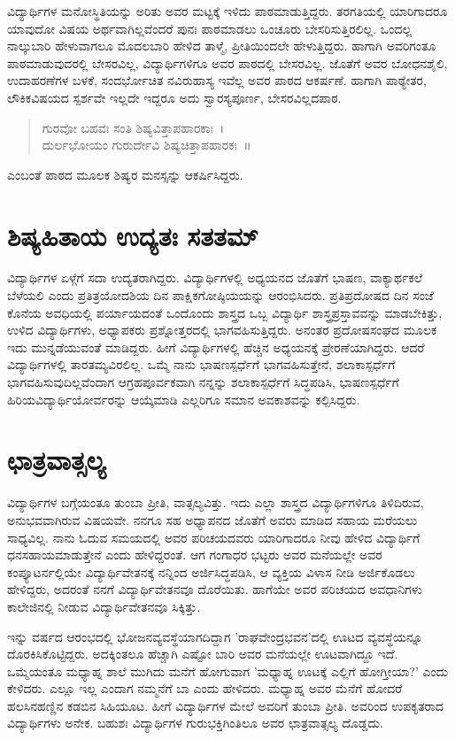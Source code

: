 {ವಿದ್ಯಾರ್ಥಿಗಳ ಮನೋಸ್ಥಿತಿಯನ್ನು ಅರಿತು ಅವರ ಮಟ್ಟಕ್ಕೆ ಇಳಿದು ಪಾಠಮಾಡುತ್ತಿದ್ದರು. ತರಗತಿಯಲ್ಲಿ ಯಾರಿಗಾದರೂ ಯಾವುದೋ ವಿಷಯ ಅರ್ಥವಾಗಿಲ್ಲವೆಂದರೆ ಪುನಃ ಪಾಠಮಾಡಲು ಒಂಚೂರು ಬೇಸರಿಸುತ್ತಿರಲಿಲ್ಲ. ಒಂದಲ್ಲ ನಾಲ್ಕುಬಾರಿ ಹೇಳುವಾಗಲೂ ಮೊದಲಬಾರಿ ಹೇಳಿದ ತಾಳ್ಮೆ, ಪ್ರೀತಿಯಿಂದಲೇ ಹೇಳುತ್ತಿದ್ದರು. ಹಾಗಾಗಿ ಅವರಿಗಂತೂ ಪಾಠಮಾಡುವುದರಲ್ಲಿ ಬೇಸರವಿಲ್ಲ, ವಿದ್ಯಾರ್ಥಿಗಳಿಗೂ ಅವರ ಪಾಠದಲ್ಲಿ ಬೇಸರವಿಲ್ಲ. ಜೊತೆಗೆ ಅವರ ಬೋಧನಶೈಲಿ, ಉದಾಹರಣೆಗಳ ಬಳಕೆ, ಸಂದರ್ಭೋಚಿತ ನವಿರುಹಾಸ್ಯ ಇವೆಲ್ಲ ಅವರ ಪಾಠದ ಆಕರ್ಷಣೆ. ಹಾಗಾಗಿ ಪಾಠ್ಯೇತರ, ಲೌಕಿಕವಿಷಯದ ಸ್ಪರ್ಶವೇ ಇಲ್ಲದೇ ಇದ್ದರೂ ಅದು ಸ್ವಾರಸ್ಯಪೂರ್ಣ, ಬೇಸರವಿಲ್ಲದಪಾಠ.
\begin{verse}
ಗುರವೋ ಬಹವಃ ಸಂತಿ ಶಿಷ್ಯವಿತ್ತಾಪಹಾರಕಾಃ~।\\
ದುರ್ಲಭೋಯಂ ಗುರುರ್ದೇವಿ ಶಿಷ್ಯಚಿತ್ತಾಪಹಾರಕಃ~॥
\end{verse}
ಎಂಬಂತೆ ಪಾಠದ ಮೂಲಕ ಶಿಷ್ಯರ ಮನಸ್ಸನ್ನು ಆಕರ್ಷಿಸಿದ್ದರು.

\section*{ಶಿಷ್ಯಹಿತಾಯ ಉದ್ಯತಃ ಸತತಮ್}

ವಿದ್ಯಾರ್ಥಿಗಳ ಏಳ್ಗೆಗೆ ಸದಾ ಉದ್ಯತರಾಗಿದ್ದರು. ವಿದ್ಯಾರ್ಥಿಗಳಲ್ಲಿ ಅಧ್ಯಯನದ ಜೊತೆಗೆ ಭಾಷಣ, ವಾಕ್ಯಾರ್ಥಕಲೆ ಬೆಳೆಯಲಿ ಎಂದು ಪ್ರತಿತ್ರಯೋದಶಿಯ ದಿನ ಪಾಕ್ಷಿಕಗೋಷ್ಠಿಯಯನ್ನು ಆರಂಭಿಸಿದರು. ಪ್ರತಿಪ್ರದೋಷದ ದಿನ ಸಂಜೆ ಕೊನೆಯ ಅವಧಿಯಲ್ಲಿ ಪರ್ಯಾಯದಂತೆ ಒಂದೊಂದು ಶಾಸ್ತ್ರದ ಒಬ್ಬ ವಿದ್ಯಾರ್ಥಿ ಶಾಸ್ತ್ರಪ್ರಸ್ತಾವವನ್ನು ಮಾಡಬೇಕಿತ್ತು, ಉಳಿದ ವಿದ್ಯಾರ್ಥಿಗಳು, ಅಧ್ಯಾಪಕರು ಪ್ರಶ್ನೋತ್ತರದಲ್ಲಿ ಭಾಗವಹಿಸುತ್ತಿದ್ದರು. ಅನಂತರ ಪ್ರದೋಷಸಂಘದ ಮೂಲಕ ಇದು ಮುನ್ನಡೆಯುವಂತೆ ಮಾಡಿದ್ದರು. ಹೀಗೆ ವಿದ್ಯಾರ್ಥಿಗಳಲ್ಲಿ ಹೆಚ್ಚಿನ ಅಧ್ಯಯನಕ್ಕೆ ಪ್ರೇರಣೆಯಾಗಿದ್ದರು. ಆದರೆ ವಿದ್ಯಾರ್ಥಿಗಳಲ್ಲಿ ತಾರತಮ್ಯವಿರಲಿಲ್ಲ. ಒಮ್ಮೆ ನಾನು ಭಾಷಣಸ್ಪರ್ಧೆಗೆ ಭಾಗವಹಿಸುತ್ತೇನೆ, ಶಲಾಕಾಸ್ಪರ್ಧೆಗೆ ಭಾಗವಹಿಸುವುದಿಲ್ಲವೆಂದಾಗ ಆಗ್ರಹಪೂರ್ವಕವಾಗಿ ನನ್ನನ್ನು ಶಲಾಕಾಸ್ಪರ್ಧೆಗೆ ಸಿದ್ಧಪಡಿಸಿ, ಭಾಷಣಸ್ಪರ್ಧೆಗೆ ಹಿರಿಯವಿದ್ಯಾರ್ಥಿಯೋರ್ವರನ್ನು ಆಯ್ಕೆಮಾಡಿ ಎಲ್ಲರಿಗೂ ಸಮಾನ ಅವಕಾಶವನ್ನು ಕಲ್ಪಿಸಿದ್ದರು.

\section*{ಛಾತ್ರವಾತ್ಸಲ್ಯ}

ವಿದ್ಯಾರ್ಥಿಗಳ ಬಗ್ಗೆಯಂತೂ ತುಂಬಾ ಪ್ರೀತಿ, ವಾತ್ಸಲ್ಯವಿತ್ತು. ಇದು ಎಲ್ಲಾ ಶಾಸ್ತ್ರದ ವಿದ್ಯಾರ್ಥಿಗಳಿಗೂ ತಿಳಿದಿರುವ, ಅನುಭವವಾಗಿರುವ ವಿಷಯವೇ. ನನಗೂ ಸಹ ಅಧ್ಯಾಪನದ ಜೊತೆಗೆ ಅವರು ಮಾಡಿದ ಸಹಾಯ ಮರೆಯಲು ಸಾಧ್ಯವಿಲ್ಲ. ನಾನು ಓದುವ ಸಮಯದಲ್ಲಿ ಅವರ ಪರಿಚಯದವರು ಯಾರಿಗಾದರೂ ನೀವು ಹೇಳಿದ ವಿದ್ಯಾರ್ಥಿಗೆ ಧನಸಹಾಯಮಾಡುತ್ತೇನೆ ಎಂದು ಹೇಳಿದ್ದರಂತೆ. ಆಗ ಗಂಗಾಧರ ಭಟ್ಟರು ಅವರ ಮನೆಯಲ್ಲೇ ಅವರ ಕಂಪ್ಯೂಟರ್ನಲ್ಲಿಯೇ ವಿದ್ಯಾರ್ಥಿವೇತನಕ್ಕೆ ನನ್ನಿಂದ ಅರ್ಜಿಸಿದ್ಧಪಡಿಸಿ, ಆ ವ್ಯಕ್ತಿಯ ವಿಳಾಸ ನೀಡಿ ಅರ್ಜಿಕೊಡಲು ಹೇಳಿದ್ದರು, ಅದರಂತೆ ನನಗೆ ವಿದ್ಯಾರ್ಥಿವೇತನವೂ ದೊರೆಯಿತು. ಹಾಗೆಯೇ ಅವರ ಪರಿಚಯದ ಅವಧಾನಿಗಳು ಕಾಲೇಜಿನಲ್ಲಿ ನೀಡುವ ವಿದ್ಯಾರ್ಥಿವೇತನವೂ ಸಿಕ್ಕಿತ್ತು.

ಇನ್ನು ವರ್ಷದ ಆರಂಭದಲ್ಲಿ ಭೋಜನವ್ಯವಸ್ಥೆಯಾಗದಿದ್ದಾಗ ’ರಾಘವೇಂದ್ರಭವನ’ದಲ್ಲಿ ಊಟದ ವ್ಯವಸ್ಥೆಯನ್ನೂ ದೊರಕಿಸಿಕೊಟ್ಟಿದ್ದರು. ಅದಕ್ಕಿಂತಲೂ ಹೆಚ್ಚಾಗಿ ಎಷ್ಟೋ ಬಾರಿ ಅವರ ಮನೆಯಲ್ಲೇ ಊಟವಾಗಿದ್ದೂ ಇದೆ. ಒಮ್ಮೆಯಂತೂ ಮಧ್ಯಾಹ್ನ ಶಾಲೆ ಮುಗಿದು ಮನೆಗೆ ಹೋಗುವಾಗ ’ಮಧ್ಯಾಹ್ನ ಊಟಕ್ಕೆ ಎಲ್ಲಿಗೆ ಹೋಗ್ತೀಯಾ?’ ಎಂದು ಕೇಳಿದರು. ಎಲ್ಲೂ ಇಲ್ಲ ಎಂದಾಗ ನಮ್ಮನೆಗೆ ಬಾ ಎಂದು ಹೇಳಿದರು. ಮಧ್ಯಾಹ್ನ ಅವರ ಮೆನೆಗೆ ಹೋದರೆ ಹಲಸಿನಹಣ್ಣಿನ ಕಡಬಿನ ಸಿಹಿಯೂಟ. ಹೀಗೆ ವಿದ್ಯಾರ್ಥಿಗಳ ಮೇಲೆ ಅವರಿಗೆ ತುಂಬಾ ಪ್ರೀತಿ. ಅವರಿಂದ ಉಪಕೃತರಾದ ವಿದ್ಯಾರ್ಥಿಗಳು ಅನೇಕ. ಬಹುಶಃ ವಿದ್ಯಾರ್ಥಿಗಳ ಗುರುಭಕ್ತಿಗಿಂತಿಲೂ ಅವರ ಛಾತ್ರವಾತ್ಸಲ್ಯ ದೊಡ್ಡದು.

}
